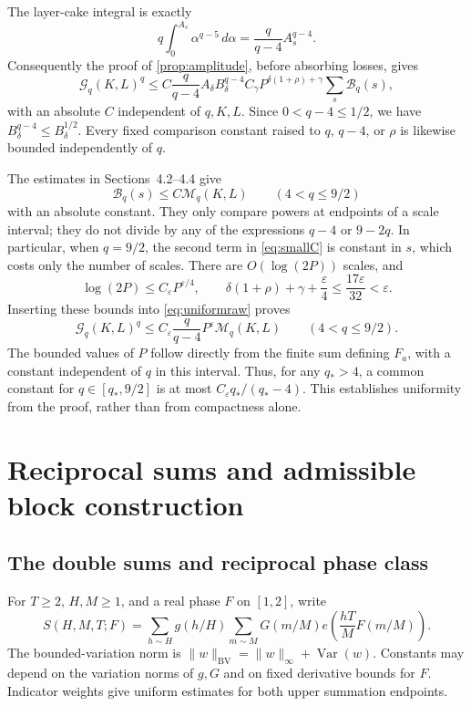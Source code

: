 \documentclass[11pt,reqno]{amsart}
\numberwithin{equation}{section}
\theoremstyle{definition}
\theoremstyle{remark}
\newcommand{\eps}{\varepsilon}
\newcommand{\Gq}{\mathcal G_q}
\newcommand{\Var}{\operatorname{Var}}
\newcommand{\BV}{\mathrm{BV}}
\begin{document}
The layer-cake integral is exactly
\[
 q\int_0^{A_s}\alpha^{q-5}\,d\alpha
 =\frac{q}{q-4}A_s^{q-4}.
\]
Consequently the proof of \cref{prop:amplitude}, before absorbing losses, gives
\begin{equation}\label{eq:uniformraw}
 \Gq(K,L)^q\le
 C\frac{q}{q-4}A_\delta B_\delta^{q-4}C_\gamma
 P^{\delta(1+\rho)+\gamma}\sum_s\mathcal B_q(s),
\end{equation}
with an absolute $C$ independent of $q,K,L$.
Since $0<q-4\le1/2$, we have $B_\delta^{q-4}\le B_\delta^{1/2}$.
Every fixed comparison constant raised to $q$, $q-4$, or $\rho$ is likewise bounded independently of $q$.

The estimates in Sections~4.2--4.4 give
\[
 \mathcal B_q(s)\le C\mathcal M_q(K,L)
 \qquad(4<q\le9/2)
\]
with an absolute constant. They only compare powers at endpoints of a scale interval; they do not divide by any of the expressions $q-4$ or $9-2q$.
In particular, when $q=9/2$, the second term in \eqref{eq:smallC} is constant in $s$, which costs only the number of scales.
There are $O(\log(2P))$ scales, and
\[
 \log(2P)\le C_\eps P^{\eps/4},
 \qquad
 \delta(1+\rho)+\gamma+\frac{\eps}{4}
 \le\frac{17\eps}{32}<\eps.
\]
Inserting these bounds into \eqref{eq:uniformraw} proves
\begin{equation}\label{eq:explicitquniform}
 \Gq(K,L)^q\le C_\eps\frac{q}{q-4}P^\eps\mathcal M_q(K,L)
 \qquad(4<q\le9/2).
\end{equation}
The bounded values of $P$ follow directly from the finite sum defining $F_a$, with a constant independent of $q$ in this interval.
Thus, for any $q_*>4$, a common constant for $q\in[q_*,9/2]$ is at most $C_\eps q_* /(q_*-4)$.
This establishes uniformity from the proof, rather than from compactness alone.

\section{Reciprocal sums and admissible block construction}\label{sec:admissibility}
\subsection{The double sums and reciprocal phase class}
For $T\ge2$, $H,M\ge1$, and a real phase $F$ on $[1,2]$, write
\begin{equation}\label{eq:S}
 S(H,M,T;F)=\sum_{h\sim H}g(h/H)\sum_{m\sim M}G(m/M)
 e\left(\frac{hT}{M}F(m/M)\right).
\end{equation}
The bounded-variation norm is $\|w\|_\BV=\|w\|_\infty+\Var(w)$.
Constants may depend on the variation norms of $g,G$ and on fixed derivative bounds for $F$.
Indicator weights give uniform estimates for both upper summation endpoints.
\end{document}
